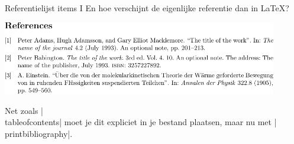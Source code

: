 
\begin{frame}{Referentielijst items I}
	En hoe verschijnt de eigenlijke referentie dan in \LaTeX?
	
	\begin{center}
		\includegraphics[width=0.9\textwidth]{assets/6_Bibliografie/snippetReferences/snippetReferences.pdf}
	\end{center}
	
	Net zoals \hll|\\tableofcontents| moet je dit expliciet in je bestand plaatsen, maar nu met
	\hll|\\printbibliography|.
\end{frame}
